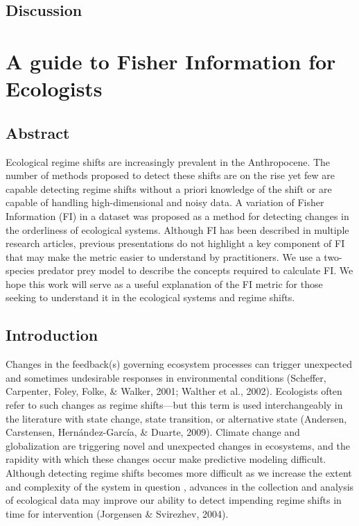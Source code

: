 \documentclass[12pt,twoside]{reedthesis}
\begin{document}
\hypertarget{discussion}{%
\section{Discussion}\label{discussion}}

\hypertarget{fiGuide}{%
\chapter{A guide to Fisher Information for Ecologists}\label{fiGuide}}

\hypertarget{abstract}{%
\section{Abstract}\label{abstract}}

Ecological regime shifts are increasingly prevalent in the Anthropocene. The number of methods proposed to detect these shifts are on the rise yet few are capable detecting regime shifts without a priori knowledge of the shift or are capable of handling high-dimensional and noisy data. A variation of Fisher Information (FI) in a dataset was proposed as a method for detecting changes in the orderliness of ecological systems. Although FI has been described in multiple research articles, previous presentations do not highlight a key component of FI that may make the metric easier to understand by practitioners. We use a two-species predator prey model to describe the concepts required to calculate FI. We hope this work will serve as a useful explanation of the FI metric for those seeking to understand it in the ecological systems and regime shifts.

\hypertarget{introduction-1}{%
\section{Introduction}\label{introduction-1}}

Changes in the feedback(s) governing ecosystem processes can trigger unexpected and sometimes undesirable responses in environmental conditions (Scheffer, Carpenter, Foley, Folke, \& Walker, 2001; Walther et al., 2002). Ecologists often refer to such changes as regime shifts---but this term is used interchangeably in the literature with state change, state transition, or alternative state (Andersen, Carstensen, Hernández-García, \& Duarte, 2009). Climate change and globalization are triggering novel and unexpected changes in ecosystems, and the rapidity with which these changes occur make predictive modeling difficult. Although detecting regime shifts becomes more difficult as we increase the extent and complexity of the system in question , advances in the collection and analysis of ecological data may improve our ability to detect impending regime shifts in time for intervention (Jorgensen \& Svirezhev, 2004).
\end{document}
